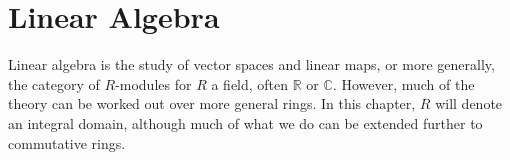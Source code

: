 \chapter{Linear Algebra}
Linear algebra is the study of vector spaces and linear maps, or more generally, the category of $R$-modules for $R$ a field, often $\mathbb{R} $ or $\mathbb{C} $. However, much of the theory can be worked out over more general rings. In this chapter, $R$ will denote an integral domain, although much of what we do can be extended further to commutative rings.








